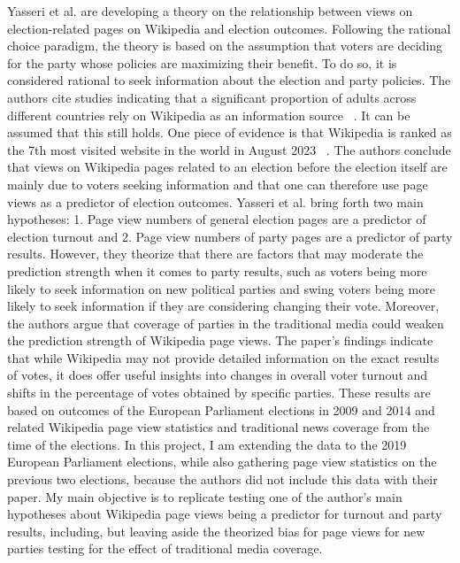 Yasseri et al. are developing a theory on the relationship between views on election-related pages on Wikipedia and election outcomes. Following the rational choice paradigm, the theory is based on the assumption that voters are deciding for the party whose policies are maximizing their benefit. To do so, it is considered rational to seek information about the election and party policies. The authors cite studies indicating that a significant proportion of adults across different countries rely on Wikipedia as an information source ~\cite{Rainie2020May, Ofcom2015}. It can be assumed that this still holds. One piece of evidence is that Wikipedia is ranked as the 7th most visited website in the world in August 2023 ~\cite{BibEntry2023Aug}. The authors conclude that views on Wikipedia pages related to an election before the election itself are mainly due to voters seeking information and that one can therefore use page views as a predictor of election outcomes. Yasseri et al. bring forth two main hypotheses: 1. Page view numbers of general election pages are a predictor of election turnout and 2. Page view numbers of party pages are a predictor of party results. However, they theorize that there are factors that may moderate the prediction strength when it comes to party results, such as voters being more likely to seek information on new political parties and swing voters being more likely to seek information if they are considering changing their vote. Moreover, the authors argue that coverage of parties in the traditional media could weaken the prediction strength of Wikipedia page views. The paper's findings indicate that while Wikipedia may not provide detailed information on the exact results of votes, it does offer useful insights into changes in overall voter turnout and shifts in the percentage of votes obtained by specific parties. These results are based on outcomes of the European Parliament elections in 2009 and 2014 and related Wikipedia page view statistics and traditional news coverage from the time of the elections. In this project, I am extending the data to the 2019 European Parliament elections, while also gathering page view statistics on the previous two elections, because the authors did not include this data with their paper. My main objective is to replicate testing one of the author's main hypotheses about Wikipedia page views being a predictor for turnout and party results, including, but leaving aside the theorized bias for page views for new parties testing for the effect of traditional media coverage.